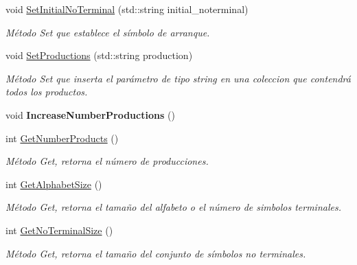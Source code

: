\begin{DoxyCompactItemize}
void \hyperlink{classGrammar_ab8e7d6fbdbbb97205f9baabab8f900cc}{Set\+Initial\+No\+Terminal} (std\+::string initial\+\_\+noterminal)
\begin{DoxyCompactList}\small\item\em Método Set que establece el símbolo de arranque. \end{DoxyCompactList}\item 
\mbox{\label{classGrammar_a4e1bc66eeb343b4125b8398d843eb8b8}} 
void \hyperlink{classGrammar_a4e1bc66eeb343b4125b8398d843eb8b8}{Set\+Productions} (std\+::string production)
\begin{DoxyCompactList}\small\item\em Método Set que inserta el parámetro de tipo string en una coleccion que contendrá todos los productos. \end{DoxyCompactList}\item 
\mbox{\label{classGrammar_af927508658f5bf62dd1fcf5926c9ca3a}} 
void {\bfseries Increase\+Number\+Productions} ()
\item 
\mbox{\label{classGrammar_a6a80e86306a800d00db406c8aaccc6c0}} 
int \hyperlink{classGrammar_a6a80e86306a800d00db406c8aaccc6c0}{Get\+Number\+Products} ()
\begin{DoxyCompactList}\small\item\em Método Get, retorna el número de producciones. \end{DoxyCompactList}\item 
\mbox{\label{classGrammar_ad56e1575da993f7bb561991666272a94}} 
int \hyperlink{classGrammar_ad56e1575da993f7bb561991666272a94}{Get\+Alphabet\+Size} ()
\begin{DoxyCompactList}\small\item\em Método Get, retorna el tamaño del alfabeto o el número de simbolos terminales. \end{DoxyCompactList}\item 
\mbox{\label{classGrammar_a155b5ce101e01e7ae0288696306d964a}} 
int \hyperlink{classGrammar_a155b5ce101e01e7ae0288696306d964a}{Get\+No\+Terminal\+Size} ()
\begin{DoxyCompactList}\small\item\em Método Get, retorna el tamaño del conjunto de símbolos no terminales. \end{DoxyCompactList}\item 

\end{DoxyCompactItemize}
